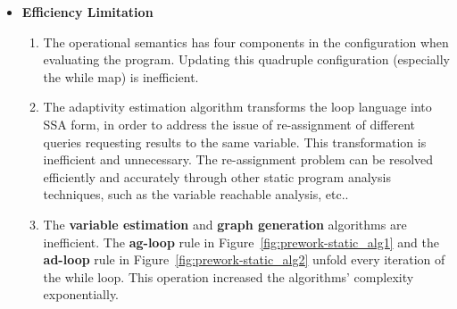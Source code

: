{\begin{itemize}
\begin{itemize}
    These variables
    are critical in analyzing the \emph{adaptivity}.
    The second cause is the dependency graph definition.
    Because the dependency graph relies on a specific memory, while-map, and a specific execution trace,
    the \emph{adaptivity} then is also defined w.r.t. one specific
    execution.
    In this sense, this adaptivity definition isn't the \emph{adaptivity} of the adaptive data analysis
    implemented by this program,
    but only its \emph{adaptivity} in a certain execution.
    \item
    The adaptivity bound computed from this framework is loose.
    Because the adaptivity estimation algorithm composes three standard static analysis techniques straightforwardly.
    The \textbf{graph generation} algorithm that uses the standard data-flow analysis technique
    over-approximates the data dependency relation in a large scale.
    And the standard path search algorithm also over-approximates the longest weighted path on this over-approximated dependency graph. 
    In this sense, the estimated adaptivity is a loose bound on the defined adaptivity.
 \end{itemize}
 \item \textbf{Efficiency Limitation}
 \begin{enumerate}
    \item The operational semantics has four components in the configuration when evaluating the program. 
    Updating this quadruple configuration (especially the while map) is inefficient.   
    \item
    The adaptivity estimation algorithm transforms the loop language into SSA form, in order to address the issue of re-assignment of different queries requesting results to the same variable.
    This transformation is inefficient and unnecessary.
    The re-assignment problem can be resolved efficiently and accurately through other static program analysis techniques, such as the
    variable reachable analysis, etc..
    \item The \textbf{variable estimation} and \textbf{graph generation} algorithms are inefficient.
    The \textbf{ag-loop} rule in Figure~\ref{fig:prework-static_alg1}
   and the \textbf{ad-loop} rule in Figure~\ref{fig:prework-static_alg2}
   unfold every iteration of the while loop.
   This operation increased the algorithms' complexity exponentially. 
    \end{enumerate}
\end{itemize}
}  